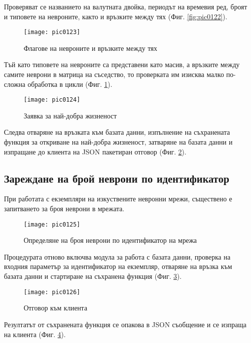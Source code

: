 Проверяват се названието на валутната двойка, периодът на времевия ред, броят и типовете на невроните, както и връзките между тях (Фиг. \ref{fig:pic0122}).

\begin{figure}[h]
  \centering
  \texttt{[image: pic0123]}
  \caption{Флагове на невроните и връзките между тях}
\label{fig:pic0123}
\end{figure}
\FloatBarrier

Тъй като типовете на невроните са представени като масив, а връзките между самите неврони в матрица на съседство, то проверката им изисква малко по-сложна обработка в цикли (Фиг. \ref{fig:pic0123}).

\begin{figure}[h]
  \centering
  \texttt{[image: pic0124]}
  \caption{Заявка за най-добра жизненост}
\label{fig:pic0124}
\end{figure}
\FloatBarrier

Следва отваряне на връзката към базата данни, изпълнение на съхранената функция за откриване на най-добра жизненост, затваряне на базата данни и изпращане до клиента на JSON пакетиран отговор (Фиг. \ref{fig:pic0124}).

\subsection{Зареждане на брой неврони по идентификатор}

При работата с екземпляри на изкуствените невронни мрежи, съществено е запитването за броя неврони в мрежата. 

\begin{figure}[h]
  \centering
  \texttt{[image: pic0125]}
  \caption{Определяне на броя неврони по идентификатор на мрежа}
\label{fig:pic0125}
\end{figure}
\FloatBarrier

Процедурата отново включва модула за работа с базата данни, проверка на входния параметър за идентификатор на екземпляр, отваряне на връзка към базата данни и стартиране на съхранена функция (Фиг. \ref{fig:pic0125}).

\begin{figure}[h]
  \centering
  \texttt{[image: pic0126]}
  \caption{Отговор към клиента}
\label{fig:pic0126}
\end{figure}
\FloatBarrier

Резултатът от съхранената функция се опакова в JSON съобщение и се изпраща на клиента (Фиг. \ref{fig:pic0126}).

